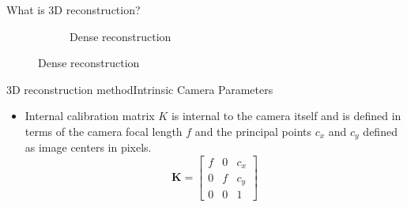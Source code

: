 \documentclass{beamer}
\begin{document}
\begin{frame}{What is 3D reconstruction?}{}
\begin{figure}[ht!]
\begin{subfigure}{.5\textwidth}
          \caption{Dense reconstruction}
          \label{fig:sub2}
      \end{subfigure}
      \label{figstart}
    \end{figure}
    \note{\textcolor{red}{Kartikeya\\}}
    \note{\textcolor{green}{Soccer\\}}
\end{frame}



\begin{frame}{3D reconstruction method}{Intrinsic Camera Parameters}
  \begin{itemize} 
    \item Internal calibration matrix  $K$ is internal to the camera itself and is defined in terms of the  camera focal length $f$ and the principal points $c_x$ and  $c_y$ defined as image centers in pixels.
  \begin{equation}
   \mathbf{K}  = 
    \begin{bmatrix}
    f & 0 & c_x \\ 0 & f & c_y \\
    0 & 0 & 1 
    \end{bmatrix}
  \end{equation}
  \end{itemize}
  \note{\textcolor{green}{Soccer\\}}
\end{frame}
\end{document}
